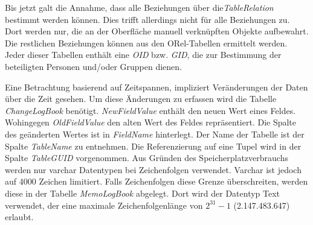 Bis jetzt galt die Annahme, dass alle Beziehungen über die\textit{TableRelation} bestimmt werden können. Dies trifft allerdings nicht für alle Beziehungen zu. Dort werden nur, die an der Oberfläche manuell verknüpften Objekte aufbewahrt. Die restlichen Beziehungen können aus den ORel-Tabellen ermittelt werden. Jeder dieser Tabellen enthält eine \textit{OID} bzw. \textit{GID}, die zur Bestimmung der beteiligten Personen und/oder Gruppen dienen.

Eine Betrachtung basierend auf Zeitspannen, impliziert Veränderungen der Daten über die Zeit gesehen. Um diese Änderungen zu erfassen wird die Tabelle \textit{ChangeLogBook} benötigt. \textit{NewFieldValue} enthält den neuen Wert eines Feldes. Wohingegen \textit{OldFieldValue} den alten Wert des Feldes repräsentiert. Die Spalte des geänderten Wertes ist in \textit{FieldName} hinterlegt. Der Name der Tabelle ist der Spalte \textit{TableName} zu entnehmen. Die Referenzierung auf eine Tupel wird in der Spalte \textit{TableGUID} vorgenommen. Aus Gründen des Speicherplatzverbrauchs werden nur varchar Datentypen bei Zeichenfolgen verwendet. Varchar ist jedoch auf 4000 Zeichen limitiert. Falls Zeichenfolgen diese Grenze überschreiten, werden diese in der Tabelle \textit{MemoLogBook} abgelegt. Dort wird der Datentyp Text verwendet, der eine maximale Zeichenfolgenlänge von $2^{31}-1$ (2.147.483.647) erlaubt.